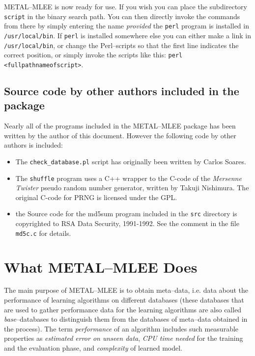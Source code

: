 \documentclass[a4paper,10pt,twoside]{article}
\newcommand{\eenameshort}{\textsf{METAL--MLEE}}
\begin{document}
\eenameshort{} is now ready for use. If you wish you can place
the subdirectory \texttt{script} in the binary search path. You 
can then directly invoke the commands from there by simply entering
the name \emph{provided} the \texttt{perl} program is installed
in \texttt{/usr/local/bin}. If \texttt{perl} is installed somewhere
else you can either make a link in \texttt{/usr/local/bin}, or 
change the Perl--scripts so that the first line
indicates the correct position, or simply invoke the scripts 
like this: \texttt{perl <fullpathnameofscript>}.

\subsection{Source code by other authors included in the package}

Nearly all of the programs included in the \eenameshort{} package
has been written by the author of this document. However the 
following code by other authors is included:

\begin{itemize}
\item The \texttt{check\_database.pl} script has originally been
written by Carlos Soares.
\item The \texttt{shuffle} program uses a C++ wrapper to the 
C-code of the \emph{Mersenne Twister} pseudo random number generator,
written by Takuji Nishimura. The original C-code for PRNG is 
licensed under the GPL.
\item the Source code for the md5sum program included in the \texttt{src}
directory is copyrighted to RSA Data Security, 1991-1992.
See the comment in the file \texttt{md5c.c} for details.
\end{itemize}

\section{What \eenameshort{} Does}
\label{purpose}

The main purpose of \eenameshort{} is to obtain meta--data,
i.e. data about the performance of learning algorithms on
different databases (these databases that are used to gather
performance data for the learning algorithms are also
called \emph{base}--databases to distinguish them from the
databases of meta--data obtained in the process).
The term \emph{performance} of an algorithm includes such 
measurable properties as \emph{estimated error on unseen
data}, \emph{CPU time needed} for the training and the 
evaluation phase, and \emph{complexity} of learned 
model.
\end{document}
